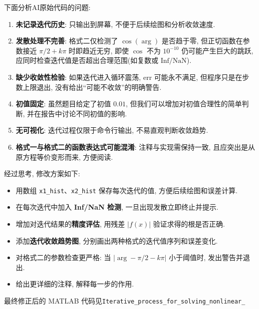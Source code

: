 \documentclass[zihao=-4,a4paper]{ctexart}
\begin{document}
下面分析AI原始代码的问题: 
\begin{enumerate}
    \item \textbf{未记录迭代历史}: 只输出到屏幕, 不便于后续绘图和分析收敛速度. 
    
    \item \textbf{发散处理不完善}: 格式二仅检测了 $\cos(\arg)$ 是否趋于零, 但正切函数在参数接近 $\pi/2 + k\pi$ 时即趋近无穷, 即使 $\cos$ 不为 $10^{-10}$ 仍可能产生巨大的跳跃, 应同时检查迭代值是否超出合理范围(如复数或 $\mathrm{Inf}/\mathrm{NaN}$). 
    
    \item \textbf{缺少收敛性检验}: 如果迭代进入循环震荡, $\mathrm{err}$ 可能永不满足, 但程序只是在步数上限退出, 没有给出“可能不收敛”的明确警告. 
    
    \item \textbf{初值固定}: 虽然题目给定了初值 $0.01$, 但我们可以增加对初值合理性的简单判断, 并在报告中讨论不同初值的影响. 
    
    \item \textbf{无可视化}: 迭代过程仅限于命令行输出, 不易直观判断收敛趋势. 
    
    \item \textbf{格式一与格式二的函数表达式可能混淆}: 注释与实现需保持一致, 且应突出是从原方程等价变形而来, 方便阅读. 
\end{enumerate}
经过思考, 修改方案如下:
\begin{itemize}
    \item 用数组 \texttt{x1\_hist}、\texttt{x2\_hist} 保存每次迭代的值, 方便后续绘图和误差计算. 
    
    \item 在每次迭代中加入 \textbf{Inf/NaN 检测}, 一旦出现发散立即终止并提示. 
    
    \item 增加对迭代结果的\textbf{精度评估}, 用残差 $|f(x)|$ 验证求得的根是否正确. 
    
    \item 添加\textbf{迭代收敛趋势图}, 分别画出两种格式的迭代值序列和误差变化. 
    
    \item 对格式二的参数检查更严格: 当 $|\arg - \pi/2 - k\pi|$ 小于阈值时, 发出警告并退出. 
    
    \item 给出更详细的注释, 解释每一步的作用. 
\end{itemize}

最终修正后的 MATLAB 代码见\texttt{Iterative\_process\_for\_solving\_nonlinear\_}
\end{document}
